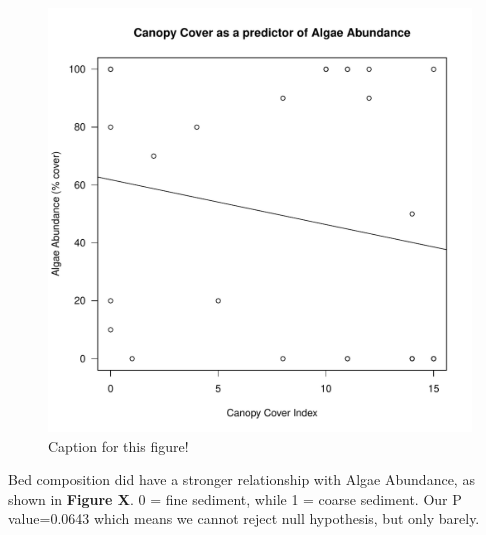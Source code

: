 \documentclass{article}\usepackage[]{graphicx}\usepackage[]{color}
\makeatletter
\def\maxwidth{ %
  \ifdim\Gin@nat@width>\linewidth
    \linewidth
  \else
    \Gin@nat@width
  \fi
}
\newenvironment{knitrout}{}{} %
\makeatother
\begin{document}
\begin{figure}[!ht]
\begin{knitrout}
\color{fgcolor}
\includegraphics[width=\maxwidth]{figure/unnamed-chunk-2-1} 

\end{knitrout}
\caption{Caption for this figure!}
\label{fig:canopyalgae}
\end{figure}

Bed composition did have a stronger relationship with Algae Abundance, as shown in \textbf{Figure X}. 0 = fine sediment, while 1 = coarse sediment. Our P value=0.0643 which means we cannot reject null hypothesis, but only barely. 
\end{document}
